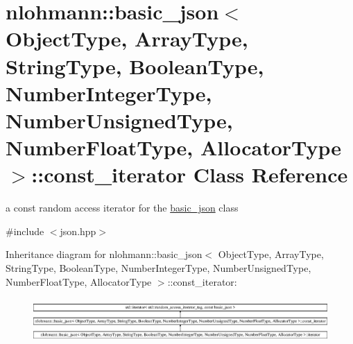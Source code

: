 \hypertarget{a00038}{}\section{nlohmann\+:\+:basic\+\_\+json$<$ Object\+Type, Array\+Type, String\+Type, Boolean\+Type, Number\+Integer\+Type, Number\+Unsigned\+Type, Number\+Float\+Type, Allocator\+Type $>$\+:\+:const\+\_\+iterator Class Reference}
\label{a00038}


a const random access iterator for the \hyperlink{a00025}{basic\+\_\+json} class  




{\ttfamily \#include $<$json.\+hpp$>$}

Inheritance diagram for nlohmann\+:\+:basic\+\_\+json$<$ Object\+Type, Array\+Type, String\+Type, Boolean\+Type, Number\+Integer\+Type, Number\+Unsigned\+Type, Number\+Float\+Type, Allocator\+Type $>$\+:\+:const\+\_\+iterator\+:\begin{figure}[H]
\begin{center}
\leavevmode
\includegraphics[height=1.705584cm]{a00038}
\end{center}
\end{figure}
